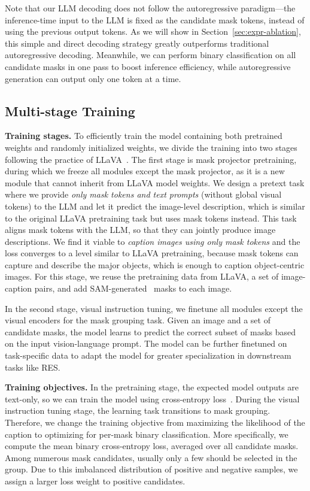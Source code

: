 Note that our LLM decoding does not follow the autoregressive paradigm---the inference-time input to the LLM is fixed as the candidate mask tokens, instead of using the previous output tokens. As we will show in Section~\ref{sec:expr-ablation}, this simple and direct decoding strategy greatly outperforms traditional autoregressive decoding. Meanwhile, we can perform binary classification on all candidate masks in one pass to boost inference efficiency, while autoregressive generation can output only one token at a time.

\subsection{Multi-stage Training}
\label{sec:model-train}

\noindent\textbf{Training stages.} To efficiently train the model containing both pretrained weights and randomly initialized weights, we divide the training into two stages following the practice of LLaVA~\cite{liu2023visual}. The first stage is mask projector pretraining, during which we freeze all modules except the mask projector, as it is a new module that cannot inherit from LLaVA model weights.
We design a pretext task where we provide \emph{only mask tokens and text prompts} (without global visual tokens) to the LLM and let it predict the image-level description, which is similar to the original LLaVA pretraining task but uses mask tokens instead.
This task aligns mask tokens with the LLM, so that they can jointly produce image descriptions. We find it viable to \emph{caption images using only mask tokens} and the loss converges to a level similar to LLaVA pretraining, because mask tokens can capture and describe the major objects, which is enough to caption object-centric images. For this stage, we reuse the pretraining data from LLaVA, a set of image-caption pairs, and add SAM-generated~\cite{kirillov2023segment} masks to each image.

In the second stage, visual instruction tuning, we finetune all modules except the visual encoders for the mask grouping task. Given an image and a set of candidate masks, the model learns to predict the correct subset of masks based on the input vision-language prompt. The model can be further finetuned on task-specific data to adapt the model for greater specialization in downstream tasks like RES.

\noindent\textbf{Training objectives.} In the pretraining stage, the expected model outputs are text-only, so we can train the model using cross-entropy loss~\cite{liu2023visual, radford2018improving}. During the visual instruction tuning stage, the learning task transitions to mask grouping. Therefore, we change the training objective from maximizing the likelihood of the caption to optimizing for per-mask binary classification.
More specifically, we compute the mean binary cross-entropy loss, averaged over all candidate masks. Among numerous mask candidates, usually only a few should be selected in the group. Due to this imbalanced distribution of positive and negative samples, we assign a larger loss weight to positive candidates.
